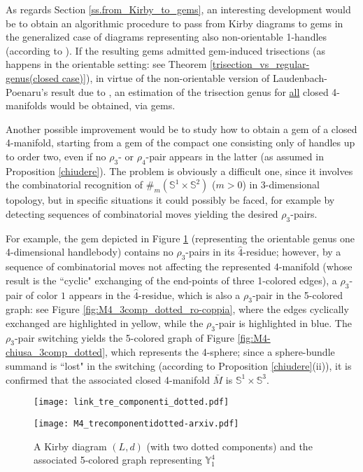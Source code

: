 \documentclass[12pt,a4paper]{article}
\begin{document}
\bigskip

As regards Section \ref{ss.from_Kirby_to_gems}, an interesting development would be to obtain an algorithmic procedure to pass from Kirby diagrams to gems
in the generalized case of diagrams representing also non-orientable 1-handles (according to \cite{Caesar De Sa}). 
If the resulting gems admitted gem-induced trisections (as happens in the orientable setting: see Theorem \ref{trisection_vs_regular-genus(closed case)}), in virtue of the non-orientable version of Laudenbach-Poenaru's result due to \cite{Miller-Naylor}, an estimation of the trisection genus for \underline{all} closed 4-manifolds would %
be obtained, via gems. 

\smallskip

Another possible improvement would be to study how to obtain a gem of a closed 4-manifold, starting from a gem of the compact one consisting only of handles up to order two, even if no $\rho_3$- or $\rho_4$-pair appears in the latter (as assumed in Proposition \ref{chiudere}). 
The problem is obviously a difficult one, since it involves the combinatorial recognition of $\#_m(\mathbb S^1 \times \mathbb S^2)$ ($m >0$) in 3-dimensional topology, but in specific situations it could possibly be faced, for example by detecting sequences of combinatorial moves yielding the desired $\rho_3$-pairs. 

For example, the gem depicted in Figure \ref{fig:M4_3comp_dotted}  (representing the orientable genus one 4-dimensional handlebody) contains no $\rho_3$-pairs in its $\hat 4$-residue; however, by a sequence of combinatorial moves not affecting the represented 4-manifold (whose result is the ``cyclic" exchanging of the end-points of three 1-colored edges), a $\rho_3$-pair of color $1$ appears in the  $\hat 4$-residue, which is also a $\rho_3$-pair in the 5-colored graph:
see Figure \ref{fig:M4_3comp_dotted_ro-coppia}, where the edges cyclically exchanged are highlighted in yellow, while the $\rho_3$-pair is highlighted in blue.
The $\rho_3$-pair switching yields the 5-colored graph of Figure \ref{fig:M4-chiusa_3comp_dotted}, which represents the 4-sphere; since a sphere-bundle summand is ``lost" in the switching (according to Proposition \ref{chiudere}(ii)), it is confirmed that the associated closed 4-manifold $\bar M$ is $\mathbb S^1 \times \mathbb S^3$.

\begin{figure}  [ht] %
    \centering
    \texttt{[image: link\_tre\_componenti\_dotted.pdf]}
    
    \texttt{[image: M4\_trecomponentidotted-arxiv.pdf]}
    \caption{A Kirby diagram $(L,d)$ (with two dotted components) and the associated 5-colored graph representing $\mathbb Y^4_1$} 
\label{fig:M4_3comp_dotted}
\end{figure}
\end{document}
